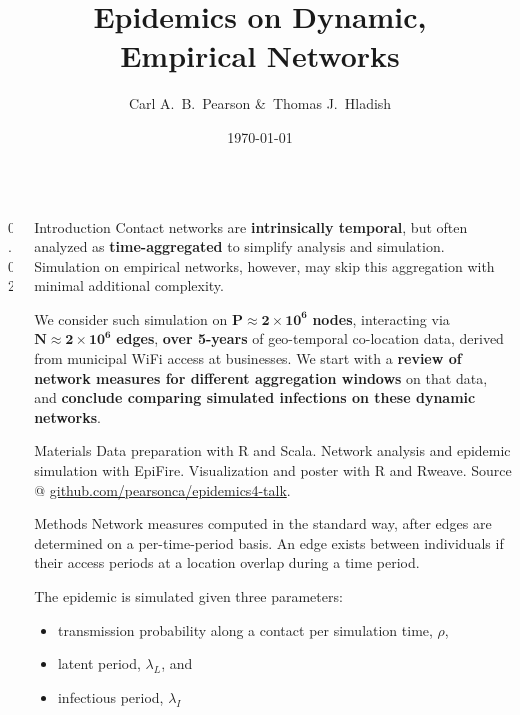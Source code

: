 \documentclass[final]{beamer} %
\title[Epi. on Emp. Nets]{Epidemics on Dynamic,\\ Empirical Networks}
\author[Pearson \& Hladish]{Carl A.~B.~Pearson \&\ Thomas J.~Hladish}
\institute[EPI-UF]{Emerging Pathogens Institute, University of Florida}
\date{\today}
\newcommand{\spaceProp}{0.02}
\newcommand{\spacer}{\begin{column}{\spaceProp\paperwidth}\end{column}}
\newenvironment{oneCol}{\begin{column}[t]{0.225\paperwidth}}{\end{column}}
\begin{document}

  \begin{frame}{}
    \begin{columns}[t]
    \spacer{}
    \begin{oneCol}
    \begin{block}{Introduction}
Contact networks are \textbf{intrinsically temporal}, but often analyzed as \textbf{time-aggregated} to simplify analysis and simulation.  Simulation on empirical networks, however, may skip this aggregation with minimal additional complexity.

We consider such simulation on $\mathbf{P\approx 2\times 10^6}$\textbf{ nodes}, interacting via $\mathbf{N\approx 2\times 10^6}$\textbf{ edges}, \textbf{over 5-years} of geo-temporal co-location data, derived from municipal WiFi access at businesses.  We start with a \textbf{review of network measures for different aggregation windows} on that data, and \textbf{conclude comparing simulated infections on these dynamic networks}.
    \end{block}
    \begin{block}{Materials}
Data preparation with R and Scala.  Network analysis and epidemic simulation with EpiFire\cite{hladish2012epifire}.  Visualization and poster with R and Rweave.  Source @ \href{https://github.com/pearsonca/epidemics4-talk}{github.com/pearsonca/epidemics4-talk}.
    \end{block}
    \begin{block}{Methods}
Network measures computed in the standard way, after edges are determined on a per-time-period basis.  An edge exists between individuals if their access periods at a location overlap during a time period.

The epidemic is simulated given three parameters:\begin{itemize}
\item transmission probability along a contact per simulation time, $\rho$,
\item latent period, $\lambda_L$, and
\item infectious period, $\lambda_I$
\end{itemize}


\end{block}
\end{oneCol}
\end{columns}
\end{frame}
\end{document}
